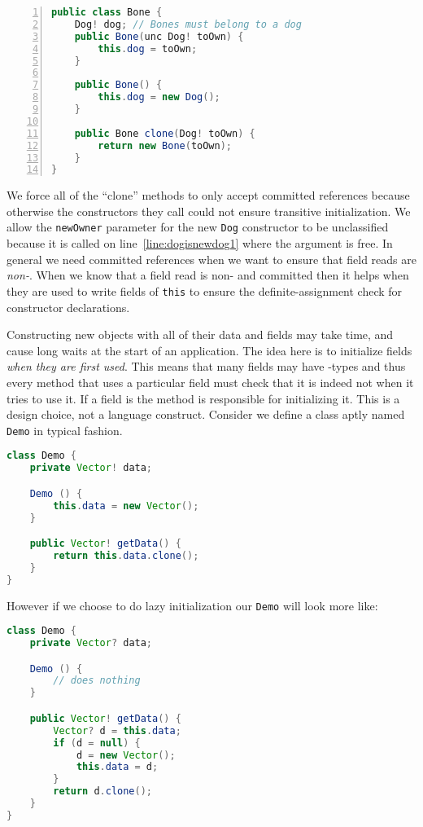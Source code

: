 \documentclass{article}
\begin{document}
\begin{example}
\begin{lstlisting}[language=Java, escapechar=|, numbers=left]
public class Bone {
    Dog! dog; // Bones must belong to a dog
    public Bone(unc Dog! toOwn) {
        this.dog = toOwn;
    }

    public Bone() {
        this.dog = new Dog();
    }

    public Bone clone(Dog! toOwn) {
        return new Bone(toOwn);
    }
}
\end{lstlisting}
  We force all of the ``clone'' methods to only accept committed references because otherwise the constructors they call could not ensure transitive initialization.
  We allow the \texttt{newOwner} parameter for the new \texttt{Dog} constructor to be unclassified because it is called on line~\ref{line:dogisnewdog1} where the argument is free.
  In general we need committed references when we want to ensure that field reads are \textit{non-\cringe{}}.
  When we know that a field read is non-\cringe{} and committed then it helps when they are used to write fields of \texttt{this} to ensure the definite-assignment check for constructor declarations.
\end{example}

\begin{definition}
  Constructing new objects with all of their data and fields may take time, and cause long waits at the start of an application.
  The idea here is to initialize fields \textit{when they are first used}.
  This means that many fields may have \cringe{}-types and thus every method that uses a particular field must check that it is indeed not \cringe{} when it tries to use it.
  If a field is \cringe{} the method is responsible for initializing it.
  This is a design choice, not a language construct.
  Consider we define a class aptly named \texttt{Demo} in typical fashion.
\begin{lstlisting}[escapechar=|, language=Java]
class Demo {
    private Vector! data;

    Demo () {
        this.data = new Vector();
    }

    public Vector! getData() {
        return this.data.clone();
    }
}
\end{lstlisting}
  However if we choose to do lazy initialization our \texttt{Demo} will look more like:
\begin{lstlisting}[escapechar=|, language=Java]
class Demo {
    private Vector? data;

    Demo () {
        // does nothing
    }

    public Vector! getData() {
        Vector? d = this.data;
        if (d = null) {
            d = new Vector();
            this.data = d;
        }
        return d.clone();
    }
}
\end{lstlisting}
\end{definition}
\end{document}
